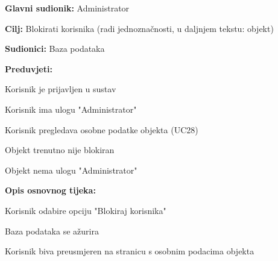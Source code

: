 					\noindent {}
					\begin{packed_item}
	
						\item \textbf{Glavni sudionik: }Administrator
						\item  \textbf{Cilj:} Blokirati korisnika (radi jednoznačnosti, u daljnjem tekstu: objekt)
						\item  \textbf{Sudionici:} Baza podataka
						\item  \textbf{Preduvjeti:}
						\item[] \begin{packed_enum}
							\item Korisnik je prijavljen u sustav
							\item Korisnik ima ulogu "Administrator"
							\item Korisnik pregledava osobne podatke objekta (UC28)
							\item Objekt trenutno nije blokiran
							\item Objekt nema ulogu "Administrator"
						\end{packed_enum}
						\item  \textbf{Opis osnovnog tijeka:}
						
						\item[] \begin{packed_enum}
	
							\item Korisnik odabire opciju "Blokiraj korisnika"
							\item Baza podataka se ažurira
							\item Korisnik biva preusmjeren na stranicu s osobnim podacima objekta
						\end{packed_enum}
						
					\end{packed_item}
					
